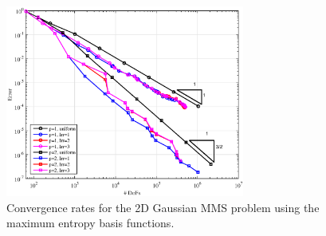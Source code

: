 \begin{figure}
\centering
\includegraphics[width=0.70\textwidth]{figures/sec_BF/TransportMMS_Gauss2D_MAXENT_Err.eps}
\caption{Convergence rates for the 2D Gaussian MMS problem using the maximum entropy basis functions.}
\label{fig::BF_Results_MMS_Gauss2D_poly}
\end{figure}

